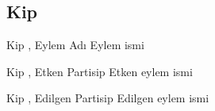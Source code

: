 \subsection*{Kip }

\begin{kip}{ \hfill Kip , Eylem Adı}
  Eylem ismi
\end{kip}

\begin{kip}{ \hfill Kip , Etken Partisip}
  Etken eylem ismi
\end{kip}

\begin{kip}{ \hfill Kip , Edilgen Partisip}
  Edilgen eylem ismi
\end{kip}





